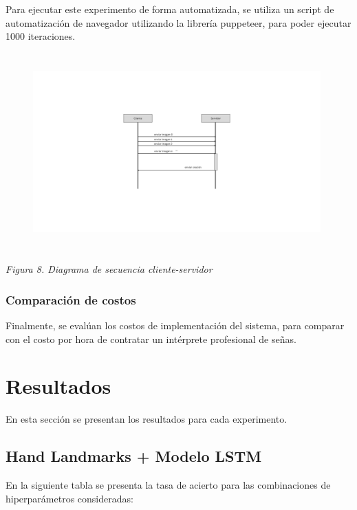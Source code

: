 \documentclass[10pt]{article}
\begin{document}
\vspace{1\baselineskip}
Para ejecutar este experimento de forma automatizada, se utiliza un script de automatización de navegador utilizando la librería puppeteer, para poder ejecutar 1000 iteraciones.

\begin{figure}[H]
\centering
\includegraphics[width=11.06cm,height=7.59cm]{./images/image10.png}
\end{figure}


\begin{center}
\textit{Figura 8. Diagrama de secuencia cliente-servidor}
\end{center}


\vspace{1\baselineskip}
\subsubsection{Comparación de costos}

Finalmente, se evalúan los costos de implementación del sistema, para comparar con el costo por hora de contratar un intérprete profesional de señas.

\section{Resultados}

\vspace{1\baselineskip}
En esta sección se presentan los resultados para cada experimento.

\subsection{Hand Landmarks + Modelo LSTM}

\vspace{1\baselineskip}
En la siguiente tabla se presenta la tasa de acierto para las combinaciones de hiperparámetros consideradas:
\end{document}
